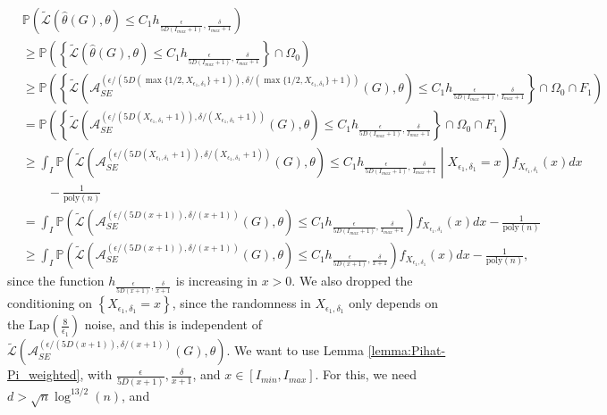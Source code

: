\documentclass{article}
\newcommand{\thetahat}{\ensuremath{\widehat{\theta}}}
\begin{document}
\begin{align*}
&\mathbb{P}\left(\widetilde{\mathcal{L}}\left(\thetahat(G), \theta\right) \leq C_1h_{\frac{\epsilon}{5D(I_{max} + 1)}, \frac{\delta}{I_{max} + 1}}\right)\\
&\geq \mathbb{P}\left(\left\{\widetilde{\mathcal{L}}\left(\thetahat(G), \theta\right) \leq C_1h_{\frac{\epsilon}{5D(I_{max} + 1)}, \frac{\delta}{I_{max} + 1}}\right\} \cap \Omega_0\right)\\
&\geq \mathbb{P}\left(\left\{\widetilde{\mathcal{L}}\left(\mathcal{A}_{SE}^{(\epsilon/(5D(\max\{1/2, X_{\epsilon_1, \delta_1}\} + 1)), \delta/(\max\{1/2, X_{\epsilon_1, \delta_1}\} + 1))}(G), \theta\right) \leq C_1h_{\frac{\epsilon}{5D(I_{max} + 1)}, \frac{\delta}{I_{max} + 1}}\right\} \cap \Omega_0 \cap F_1\right)\\
&= \mathbb{P}\left(\left\{\widetilde{\mathcal{L}}\left(\mathcal{A}_{SE}^{(\epsilon/(5D(X_{\epsilon_1, \delta_1} + 1)), \delta/(X_{\epsilon_1, \delta_1} + 1))}(G), \theta\right) \leq C_1h_{\frac{\epsilon}{5D(I_{max} + 1)}, \frac{\delta}{I_{max} + 1}}\right\} \cap \Omega_0 \cap F_1\right)\\
&\geq \int_I\mathbb{P}\left(\widetilde{\mathcal{L}}\left(\mathcal{A}_{SE}^{(\epsilon/(5D(X_{\epsilon_1, \delta_1} + 1)), \delta/(X_{\epsilon_1, \delta_1} + 1))}(G), \theta\right) \leq C_1h_{\frac{\epsilon}{5D(I_{max} + 1)}, \frac{\delta}{I_{max} + 1}}\middle\vert X_{\epsilon_1, \delta_1} = x\right)f_{X_{\epsilon_1, \delta_1}}(x)dx \\
%
& \qquad - \frac{1}{\mathrm{poly}(n)}\\
&= \int_I\mathbb{P}\left(\widetilde{\mathcal{L}}\left(\mathcal{A}_{SE}^{(\epsilon/(5D(x + 1)), \delta/(x + 1))}(G), \theta\right) \leq C_1h_{\frac{\epsilon}{5D(I_{max} + 1)}, \frac{\delta}{I_{max} + 1}}\right)f_{X_{\epsilon_1, \delta_1}}(x)dx - \frac{1}{\mathrm{poly}(n)}\\
&\geq \int_I\mathbb{P}\left(\widetilde{\mathcal{L}}\left(\mathcal{A}_{SE}^{(\epsilon/(5D(x + 1)), \delta/(x + 1))}(G), \theta\right) \leq C_1h_{\frac{\epsilon}{5D(x + 1)}, \frac{\delta}{x + 1}}\right)f_{X_{\epsilon_1, \delta_1}}(x)dx - \frac{1}{\mathrm{poly}(n)},
\end{align*}
since the function $h_{\frac{\epsilon}{5D(x + 1)}, \frac{\delta}{x + 1}}$ is increasing in $x > 0$. We also dropped the conditioning on $\left\{X_{\epsilon_1, \delta_1} = x\right\}$, since the randomness in $X_{\epsilon_1, \delta_1}$ only depends on the $\mathrm{Lap}\left(\frac{8}{\epsilon_1}\right)$ noise, and this is independent of $\widetilde{\mathcal{L}}\left(\mathcal{A}_{SE}^{(\epsilon/(5D(x + 1)), \delta/(x + 1))}(G), \theta\right)$. We want to use Lemma \ref{lemma:Pihat-Pi_weighted}, with $\frac{\epsilon}{5D(x + 1)}, \frac{\delta}{x + 1}$, and $x \in [I_{min}, I_{max}]$. For this, we need $d > \sqrt{n}\log^{13/2}(n)$, and 
\end{document}
